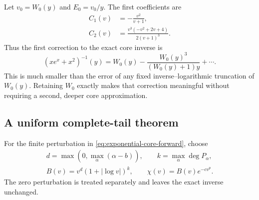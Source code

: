\begin{example}
Let $v_0=W_0(y)$ and $E_0=v_0/y$. The first coefficients are
\begin{align}
 C_1(v)&=-\frac{v^2}{v+1},
 \label{eq:xexpx-core-first-coefficient}\\
 C_2(v)&=\frac{v^3(-v^2+2v+4)}{2(v+1)^3}.
 \label{eq:xexpx-core-second-coefficient}
\end{align}
Thus the first correction to the exact core inverse is
\[
 (xe^x+x^2)^{-1}(y)
 =W_0(y)-\frac{W_0(y)^3}{(W_0(y)+1)y}+\cdots.
\]
This is much smaller than the error of any fixed inverse--logarithmic
truncation of $W_0(y)$. Retaining $W_0$ exactly makes that correction
meaningful without requiring a second, deeper core approximation.
\end{example}

\subsection{A uniform complete-tail theorem}

For the finite perturbation in \eqref{eq:exponential-core-forward}, choose
\begin{equation}
\begin{gathered}
 d=\max(0,\max_\alpha(\alpha-b)),\qquad
 k=\max_\alpha\deg P_\alpha,\\
 B(v)=v^d(1+|\log v|)^k,\qquad \chi(v)=B(v)e^{-cv^p}.
\end{gathered}
 \label{eq:exponential-core-envelope}
\end{equation}
The zero perturbation is treated separately and leaves the exact inverse
unchanged.

